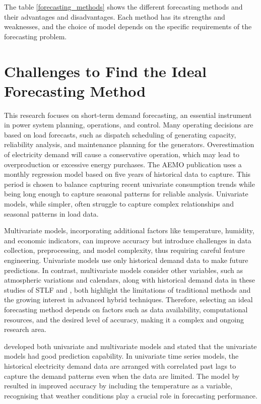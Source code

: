 \documentclass[mstat,12pt]{unswthesis}
\begin{document}
The table \ref{forecasting_methods} shows the different forecasting
methods and their advantages and disadvantages. Each method has its
strengths and weaknesses, and the choice of model depends on the
specific requirements of the forecasting problem. \bigskip

\hypertarget{challenges-to-find-the-ideal-forecasting-method}{%
\section{Challenges to Find the Ideal Forecasting
Method}\label{challenges-to-find-the-ideal-forecasting-method}}

This research focuses on short-term demand forecasting, an essential
instrument in power system planning, operations, and control. Many
operating decisions are based on load forecasts, such as dispatch
scheduling of generating capacity, reliability analysis, and maintenance
planning for the generators. Overestimation of electricity demand will
cause a conservative operation, which may lead to overproduction or
excessive energy purchases. The AEMO publication \cite{AEMO} uses a
monthly regression model based on five years of historical data to
capture. This period is chosen to balance capturing recent univariate
consumption trends while being long enough to capture seasonal patterns
for reliable analysis. Univariate models, while simpler, often struggle
to capture complex relationships and seasonal patterns in load data.

Multivariate models, incorporating additional factors like temperature,
humidity, and economic indicators, can improve accuracy but introduce
challenges in data collection, preprocessing, and model complexity, thus
requiring careful feature engineering. Univariate models use only
historical demand data to make future predictions. In contrast,
multivariate models consider other variables, such as atmospheric
variations and calendars, along with historical demand data in these
studies of STLF \cite{wang2016review} and \cite{chen2015electricity},
both highlight the limitations of traditional methods and the growing
interest in advanced hybrid techniques. Therefore, selecting an ideal
forecasting method depends on factors such as data availability,
computational resources, and the desired level of accuracy, making it a
complex and ongoing research area.

\cite{taylor2009forecasting} developed both univariate and multivariate
models and stated that the univariate models had good prediction
capability. In univariate time series models, the historical electricity
demand data are arranged with correlated past lags to capture the demand
patterns even when the data are limited. The model by
\cite{mcculloch2001forecasting} resulted in improved accuracy by
including the temperature as a variable, recognising that weather
conditions play a crucial role in forecasting performance.
\end{document}
